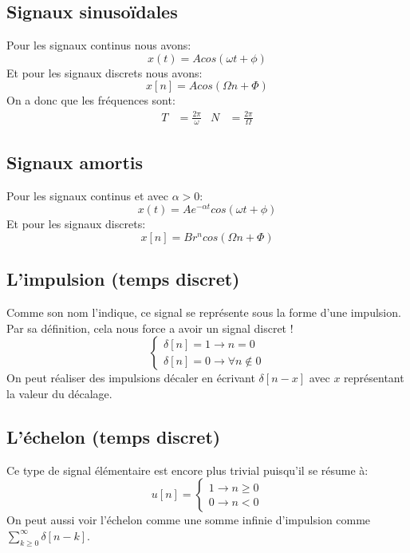 \documentclass{report}
\begin{document}
\subsection{Signaux sinusoïdales}
Pour les signaux continus nous avons:
\begin{equation}
x(t) = A cos(\omega t + \phi)
\end{equation}
Et pour les signaux discrets nous avons:
\begin{equation}
x[n] = A cos(\Omega n + \Phi)
\end{equation}
On a donc que les fréquences sont:
\begin{align}
T &= \frac{2 \pi}{\omega} & N &= \frac{2 \pi}{\Omega}
\end{align}

\subsection{Signaux amortis}
Pour les signaux continus et avec $\alpha > 0$:
\begin{equation}
x(t) = A e^{-\alpha t}cos(\omega t + \phi)
\end{equation}
Et pour les signaux discrets:
\begin{equation}
x[n] = Br^ncos(\Omega n + \Phi)
\end{equation}

\subsection{L'impulsion (temps discret)}
Comme son nom l'indique, ce signal se représente sous la forme d'une impulsion. Par sa définition, cela nous force a avoir un signal discret !
\begin{equation}
\begin{cases}
\delta [n] = 1 \rightarrow n = 0 \\
\delta [n] = 0 \rightarrow \forall n \notin 0
\end{cases}
\end{equation}
On peut réaliser des impulsions décaler en écrivant $\delta [n-x]$ avec $x$ représentant la valeur du décalage.

\subsection{L'échelon (temps discret)}
Ce type de signal élémentaire est encore plus trivial puisqu'il se résume à:
\begin{equation}\label{eq:1}
u[n]=
\begin{cases}
1 \rightarrow n \geq 0 \\
0 \rightarrow n < 0
\end{cases}
\end{equation}
On peut aussi voir l'échelon comme une somme infinie d'impulsion comme $\sum_{k \geq 0}^{\infty} \delta[n-k]$.
\end{document}
